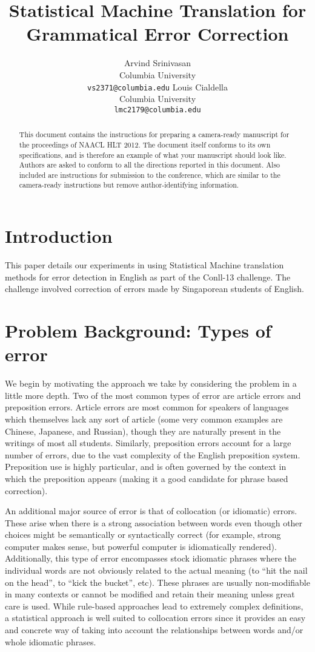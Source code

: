 \documentclass[11pt,letterpaper]{article}
\title{Statistical Machine Translation for Grammatical Error Correction}
\author{Arvind Srinivasan\\
	    Columbia University\\
	    {\tt vs2371@columbia.edu}
	  \And
	Louis Cialdella\\
  	Columbia University\\
  {\tt lmc2179@columbia.edu}}
\date{}
\begin{document}
\maketitle
\begin{abstract}
  This document contains the instructions for preparing a camera-ready
  manuscript for the proceedings of NAACL HLT 2012. The document itself conforms
  to its own specifications, and is therefore an example of what
  your manuscript should look like.  Authors are asked to conform to
  all the directions reported in this document.  Also included are instructions for
  submission to the conference, which are similar to the camera-ready instructions
  but remove author-identifying information.
\end{abstract}

\section{Introduction}

This paper details our experiments in using Statistical Machine translation methods for 
error detection in English as part of the Conll-13 challenge. The challenge involved 
correction of errors made by Singaporean students of English.

\section{Problem Background: Types of error}
\indent We begin by motivating the approach we take by considering the problem in a little more depth. Two of the most common types of error are article errors and preposition errors. 
Article errors are most common for speakers of languages which themselves lack any sort of article 
(some very common examples are Chinese, Japanese, and Russian), though they are naturally present 
in the writings of most all students. Similarly, preposition errors account for a large number of 
errors, due to the vast complexity of the English preposition system. Preposition use is highly particular, 
and is often governed by the context in which the preposition appears (making it a good candidate for 
phrase based correction). \newline

\indent An additional major source of error is that of collocation (or idiomatic) errors. These 
arise when there is a strong association between words even though other choices might be semantically 
or syntactically correct (for example, strong computer makes sense, but powerful computer is idiomatically 
rendered). Additionally, this type of error encompasses stock idiomatic phrases where the individual words 
are not obviously related to the actual meaning (to “hit the nail on the head”, to “kick the bucket”, etc). 
These phrases are usually non-modifiable in many contexts or cannot be modified and retain their meaning 
unless great care is used. While rule-based approaches lead to extremely complex definitions, a 
statistical approach is well suited to collocation errors since it provides an easy and concrete way 
of taking into account the relationships between words and/or whole idiomatic phrases. \newline
\end{document}

